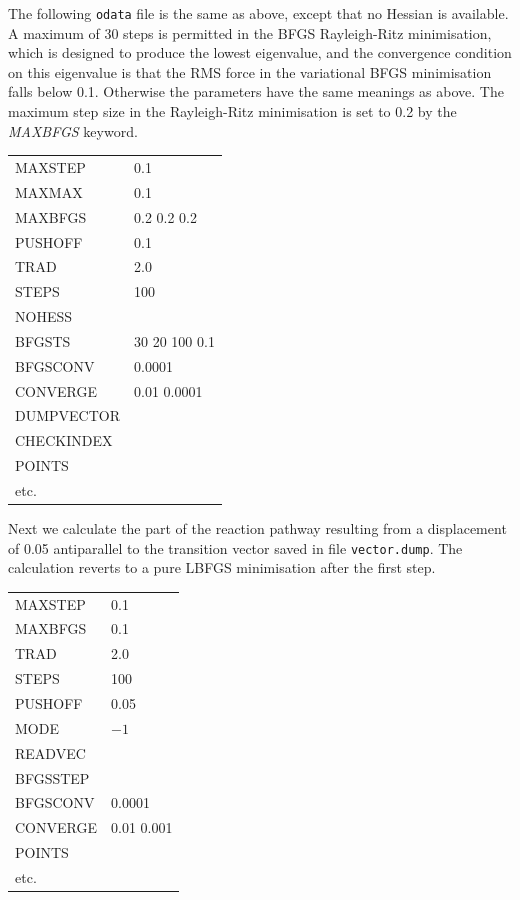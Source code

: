 \documentclass[12pt,a4paper,dvips]{article}
\begin{document}
\noindent The following {\tt odata} file is the same as above, except that no Hessian is
available. A maximum of 30 steps is permitted in the BFGS Rayleigh-Ritz
minimisation, which is designed to produce the lowest eigenvalue, and the
convergence condition on this eigenvalue is that the RMS force in the variational BFGS
minimisation falls below 0.1.
Otherwise the parameters have the same meanings as above.
The maximum step size in the Rayleigh-Ritz minimisation is set to 0.2 by the
{\it MAXBFGS\/} keyword.

\medskip
\begin{tabular}{ll}
 MAXSTEP & 0.1 \\
 MAXMAX  & 0.1 \\
 MAXBFGS & 0.2 0.2 0.2 \\
 PUSHOFF & 0.1 \\
 TRAD & 2.0 \\
 STEPS & 100 \\
 NOHESS \\
 BFGSTS & 30 20 100 0.1 \\
 BFGSCONV & 0.0001 \\
 CONVERGE & 0.01 0.0001 \\
 DUMPVECTOR \\
 CHECKINDEX \\
 POINTS \\
 etc. \\
\end{tabular}
\medskip

\noindent Next we calculate the part of the reaction pathway
resulting from a displacement of 0.05 antiparallel to the transition
vector saved in file {\tt vector.dump}. 
The calculation reverts to a pure LBFGS minimisation after the first step.

\medskip
\begin{tabular}{ll}
 MAXSTEP & 0.1 \\
 MAXBFGS & 0.1 \\
 TRAD & 2.0 \\
 STEPS & 100 \\
 PUSHOFF & 0.05 \\
 MODE & $-1$ \\
 READVEC \\
 BFGSSTEP \\
 BFGSCONV & 0.0001 \\
 CONVERGE & 0.01 0.001 \\
 POINTS \\
 etc. \\
\end{tabular}
\end{document}
